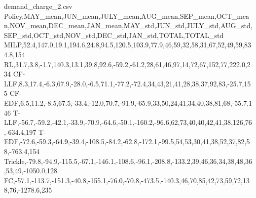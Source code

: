 
\begin{filecontents}{demand_charge_2.csv}
Policy,MAY_mean,JUN_mean,JULY_mean,AUG_mean,SEP_mean,OCT_mean,NOV_mean,DEC_mean,JAN_mean,MAY_std,JUN_std,JULY_std,AUG_std,SEP_std,OCT_std,NOV_std,DEC_std,JAN_std,TOTAL,TOTAL_std
MILP,52.4,147.0,19.1,194.6,24.8,94.5,120.5,103.9,77.9,46,59,32,58,31,67,52,49,59,834.8,154
RL,31.7,3.8,-1.7,140.3,13.1,39.8,92.6,-59.2,-61.2,28,61,46,97,14,72,67,152,77,222.0,234
CF-LLF,8.3,17.4,-6.3,67.9,-28.0,-6.5,71.1,-77.2,-72.4,34,43,21,41,28,38,37,92,83,-25.7,155
CF-EDF,6.5,11.2,-8.5,67.5,-33.4,-12.0,70.7,-91.9,-65.9,33,50,24,41,34,40,38,81,68,-55.7,146
T-LLF,-56.7,-59.2,-42.1,-33.9,-70.9,-64.6,-50.1,-160.2,-96.6,62,73,40,40,42,41,38,126,76,-634.4,197
T-EDF,-72.6,-59.3,-64.9,-39.4,-108.5,-84.2,-62.8,-172.1,-99.5,54,53,30,41,38,52,37,82,58,-763.4,154
Trickle,-79.8,-94.9,-115.5,-67.1,-146.1,-108.6,-96.1,-208.8,-133.2,39,46,36,34,38,48,36,53,49,-1050.0,128
FC,-57.1,-113.7,-151.3,-40.8,-155.1,-76.0,-70.8,-473.5,-140.3,46,70,85,42,73,59,72,138,76,-1278.6,235 
\end{filecontents}

